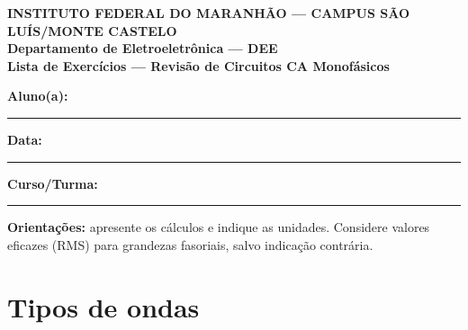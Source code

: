 \documentclass[12pt,a4paper]{article}
\begin{document}
\begin{center}
\textbf{INSTITUTO FEDERAL DO MARANHÃO — CAMPUS SÃO LUÍS/MONTE CASTELO}\\
\textbf{Departamento de Eletroeletrônica — DEE}\\[0.55em]
{\Large\textbf{Lista de Exercícios — Revisão de Circuitos CA Monofásicos}}
\end{center}

\vspace{0.45em}
\textbf{Aluno(a):} \rule{8.2cm}{0.4pt}\hfill
\textbf{Data:} \rule{2.8cm}{0.4pt}

\textbf{Curso/Turma:} \rule{7cm}{0.4pt}

\vspace{0.35em}
\textbf{Orientações:} apresente os cálculos e indique as unidades. Considere valores eficazes (RMS) para grandezas fasoriais, salvo indicação contrária.

\section{Tipos de ondas}
\end{document}
